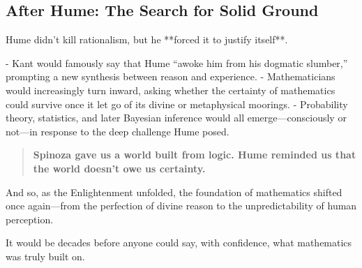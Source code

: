 \subsection*{After Hume: The Search for Solid Ground}

Hume didn’t kill rationalism, but he **forced it to justify itself**.

- Kant would famously say that Hume “awoke him from his dogmatic slumber,” prompting a new synthesis between reason and experience.
- Mathematicians would increasingly turn inward, asking whether the certainty of mathematics could survive once it let go of its divine or metaphysical moorings.
- Probability theory, statistics, and later Bayesian inference would all emerge—consciously or not—in response to the deep challenge Hume posed.

\begin{quote}
\textbf{Spinoza gave us a world built from logic.  
Hume reminded us that the world doesn't owe us certainty.}
\end{quote}

And so, as the Enlightenment unfolded, the foundation of mathematics shifted once again—from the perfection of divine reason to the unpredictability of human perception.

It would be decades before anyone could say, with confidence, what mathematics was truly built on.

